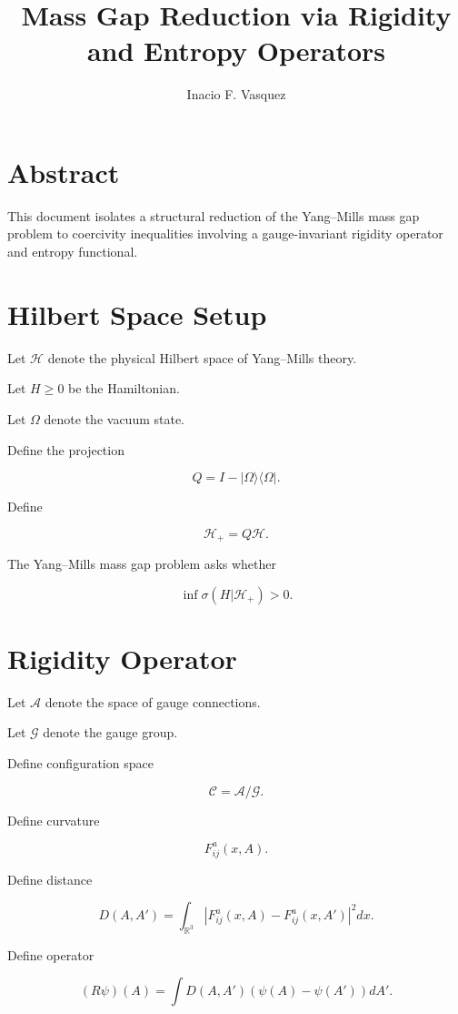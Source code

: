 \documentclass[11pt]{article}
\title{Mass Gap Reduction via Rigidity and Entropy Operators}
\author{Inacio F. Vasquez}
\date{}
\begin{document}
\maketitle

\section*{Abstract}

This document isolates a structural reduction of the Yang--Mills mass gap problem to coercivity inequalities involving a gauge-invariant rigidity operator and entropy functional.

\section{Hilbert Space Setup}

Let $\mathcal{H}$ denote the physical Hilbert space of Yang--Mills theory.

Let $H \ge 0$ be the Hamiltonian.

Let $\Omega$ denote the vacuum state.

Define the projection

\[
Q = I - |\Omega\rangle \langle\Omega|.
\]

Define

\[
\mathcal{H}_+ = Q\mathcal{H}.
\]

The Yang--Mills mass gap problem asks whether

\[
\inf \sigma(H|\mathcal{H}_+) > 0.
\]

\section{Rigidity Operator}

Let $\mathcal{A}$ denote the space of gauge connections.

Let $\mathcal{G}$ denote the gauge group.

Define configuration space

\[
\mathcal{C} = \mathcal{A}/\mathcal{G}.
\]

Define curvature

\[
F_{ij}^a(x,A).
\]

Define distance

\[
D(A,A') = \int_{\mathbb{R}^3} |F_{ij}^a(x,A)-F_{ij}^a(x,A')|^2 dx.
\]

Define operator

\[
(R\psi)(A) = \int D(A,A')(\psi(A)-\psi(A'))dA'.
\]
\end{document}
